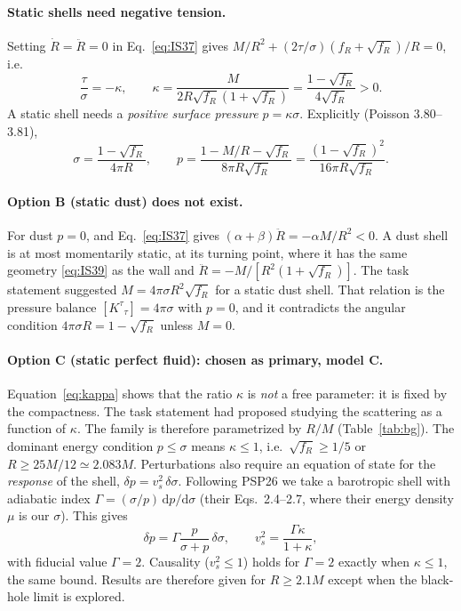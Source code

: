 \documentclass[11pt,a4paper]{article}
\numberwithin{equation}{section}
\newcommand{\sq}{\sqrt{f_R}}
\newcommand{\dd}{\mathrm{d}}
\begin{document}
\paragraph{Static shells need negative tension.} Setting $\dot R=\ddot R=0$ in Eq.~\eqref{eq:IS37} gives
$M/R^2+(2\tau/\sigma)(f_R+\sq)/R=0$, i.e.
\begin{equation}
\frac{\tau}{\sigma}=-\kappa,\qquad \kappa=\frac{M}{2R\sq(1+\sq)}=\frac{1-\sq}{4\sq}>0 .
\label{eq:kappa}
\end{equation}
A static shell needs a \emph{positive surface pressure} $p=\kappa\sigma$. Explicitly (Poisson 3.80--3.81),
\begin{equation}
\sigma=\frac{1-\sq}{4\pi R},\qquad p=\frac{1-M/R-\sq}{8\pi R\sq}=\frac{(1-\sq)^2}{16\pi R\sq}.
\label{eq:static}
\end{equation}

\paragraph{Option B (static dust) does not exist.} For dust $p=0$, and Eq.~\eqref{eq:IS37} gives
$(\alpha+\beta)\ddot R=-\alpha M/R^2<0$. A dust shell is at most momentarily static, at its turning point, where
it has the same geometry \eqref{eq:IS39} as the wall and $\ddot R=-M/[R^2(1+\sq)]$. The task statement suggested
$M=4\pi\sigma R^2\sq$ for a static dust shell. That relation is the pressure balance $[K^\tau{}_\tau]=4\pi\sigma$ with $p=0$,
and it contradicts the angular condition $4\pi\sigma R=1-\sq$ unless $M=0$.

\paragraph{Option C (static perfect fluid): chosen as primary, model C.} Equation~\eqref{eq:kappa} shows that the
ratio $\kappa$ is \emph{not} a free parameter: it is fixed by the compactness. The task statement had proposed
studying the scattering as a function of $\kappa$. The family is therefore parametrized by $R/M$
(Table~\ref{tab:bg}). The dominant energy condition $p\le\sigma$ means $\kappa\le1$, i.e.\ $\sq\ge1/5$ or
$R\ge25M/12\simeq2.083M$. Perturbations also require an equation of state for the \emph{response} of the shell,
$\delta p=v_s^2\,\delta\sigma$. Following PSP26 we take a barotropic shell with adiabatic index
$\Gamma=(\sigma/p)\,\dd p/\dd\sigma$ (their Eqs.~2.4--2.7, where their energy density $\mu$ is our $\sigma$). This gives
\begin{equation}
\delta p=\Gamma\frac{p}{\sigma+p}\,\delta\sigma,\qquad v_s^2=\frac{\Gamma\kappa}{1+\kappa},
\label{eq:eos}
\end{equation}
with fiducial value $\Gamma=2$. Causality ($v_s^2\le1$) holds for $\Gamma=2$ exactly when $\kappa\le1$, the same
bound. Results are therefore given for $R\ge2.1M$ except when the black-hole limit is explored.
\end{document}
